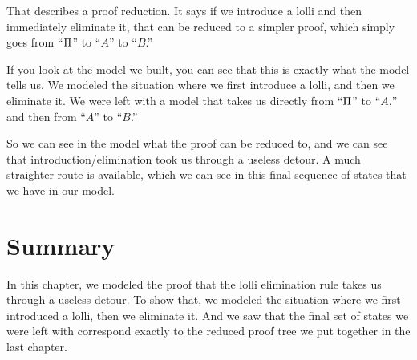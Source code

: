 \documentclass[../../../main.tex]{subfiles}
\begin{document}
\noindent
That describes a proof reduction. It says if we introduce a lolli and then immediately eliminate it, that can be reduced to a simpler proof, which simply goes from ``$\Proof/$'' to ``$A$'' to ``$B$.''

If you look at the model we built, you can see that this is exactly what the model tells us. We modeled the situation where we first introduce a lolli, and then we eliminate it. We were left with a model that takes us directly from ``$\Proof/$'' to ``$A$,'' and then from ``$A$'' to ``$B$.''

So we can see in the model what the proof can be reduced to, and we can see that introduction/elimination took us through a useless detour. A much straighter route is available, which we can see in this final sequence of states that we have in our model.


\section{Summary}

In this chapter, we modeled the proof that the lolli elimination rule takes us through a useless detour. To show that, we modeled the situation where we first introduced a lolli, then we eliminate it. And we saw that the final set of states we were left with correspond exactly to the reduced proof tree we put together in the last chapter.
\end{document}
